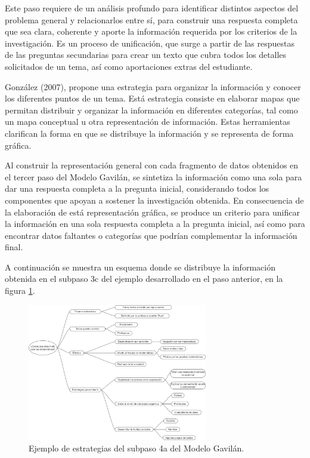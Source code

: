 Este paso requiere de un análisis profundo para identificar distintos aspectos del problema general y relacionarlos entre sí, para construir una respuesta completa que sea clara, coherente y aporte la información requerida por los criterios de la investigación. Es un proceso de unificación, que surge a partir de las respuestas de las preguntas secundarias para crear un texto que cubra todos los detalles solicitados de un tema, así como aportaciones extras del estudiante.

González (2007), propone una estrategia para organizar la información y conocer los diferentes puntos de un tema. Está estrategia consiste en elaborar mapas que permitan distribuir y organizar la información en diferentes categorías, tal como un mapa conceptual u otra representación de información. Estas herramientas clarifican la forma en que se distribuye la información y se representa de forma gráfica.

Al construir la representación general con cada fragmento de datos obtenidos en el tercer paso del Modelo Gavilán, se sintetiza la información como una sola para dar una respuesta completa a la pregunta inicial, considerando todos los componentes que apoyan a sostener la investigación obtenida. En consecuencia de la elaboración de está representación gráfica, se produce un criterio para unificar la información en una sola respuesta completa a la pregunta inicial, así como para encontrar datos faltantes o categorías que podrían complementar la información final.

A continuación se muestra un esquema donde se distribuye la información obtenida en el subpaso 3c del ejemplo  desarrollado en el paso anterior, en la figura \ref{fig:27}.

\begin{figure}[H]
  \centering
  \includegraphics[width=0.70\textwidth]{Cap2/Figuras/Ejemplo de estraregia del subpaso 4a.jpg}
  \caption{Ejemplo de estrategias del subpaso 4a del Modelo Gavilán.}
  \label{fig:27}
\end{figure}

